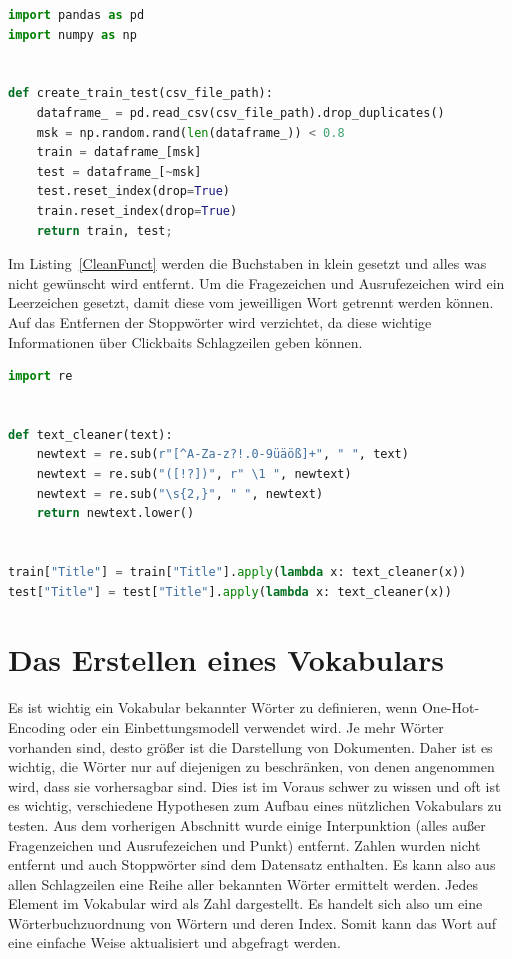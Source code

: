 \begin{lstlisting}[language=Python,caption=Funktion für das Aufteilen des Datensatzes, label={TrainTestFunc}]
import pandas as pd
import numpy as np


def create_train_test(csv_file_path):
    dataframe_ = pd.read_csv(csv_file_path).drop_duplicates()
    msk = np.random.rand(len(dataframe_)) < 0.8
    train = dataframe_[msk]
    test = dataframe_[~msk]
    test.reset_index(drop=True)
    train.reset_index(drop=True)
    return train, test;
\end{lstlisting}

Im Listing~\ref{CleanFunct} werden die Buchstaben in klein gesetzt und alles was nicht gewünscht wird entfernt. Um die Fragezeichen und Ausrufezeichen wird ein Leerzeichen gesetzt, damit diese vom jeweilligen Wort getrennt werden können. Auf das Entfernen der Stoppwörter wird verzichtet, da diese wichtige Informationen über Clickbaits Schlagzeilen geben können.

\begin{lstlisting}[language=Python,caption=Die Preprocessing-Funktion, label={CleanFunct}]
import re


def text_cleaner(text):
    newtext = re.sub(r"[^A-Za-z?!.0-9üäöß]+", " ", text)
    newtext = re.sub("([!?])", r" \1 ", newtext)
    newtext = re.sub("\s{2,}", " ", newtext)
    return newtext.lower()
    
    
train["Title"] = train["Title"].apply(lambda x: text_cleaner(x))
test["Title"] = test["Title"].apply(lambda x: text_cleaner(x))
\end{lstlisting}

\section{Das Erstellen eines Vokabulars}


Es ist wichtig ein Vokabular bekannter Wörter zu definieren, wenn One-Hot-Encoding oder ein Einbettungsmodell verwendet wird. Je mehr Wörter vorhanden sind, desto größer ist die Darstellung von Dokumenten. Daher ist es wichtig, die Wörter nur auf diejenigen zu beschränken, von denen angenommen wird, dass sie vorhersagbar sind. Dies ist im Voraus schwer zu wissen und oft ist es wichtig, verschiedene Hypothesen zum Aufbau eines nützlichen Vokabulars zu testen. Aus dem vorherigen Abschnitt wurde einige Interpunktion (alles außer Fragenzeichen und Ausrufezeichen und Punkt) entfernt. Zahlen wurden nicht entfernt und auch Stoppwörter sind dem Datensatz enthalten. Es kann also aus allen Schlagzeilen eine Reihe aller bekannten Wörter ermittelt werden. Jedes Element im Vokabular wird als Zahl dargestellt. Es handelt sich also um eine Wörterbuchzuordnung von Wörtern und deren Index. Somit kann das Wort auf eine einfache Weise aktualisiert und abgefragt werden.

